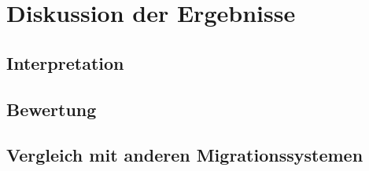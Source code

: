 \chapter{Diskussion der Ergebnisse}
    \label{chapter:FindingsDiscussion}
    \section{Interpretation}
    \section{Bewertung}
    \section{Vergleich mit anderen Migrationssystemen}
